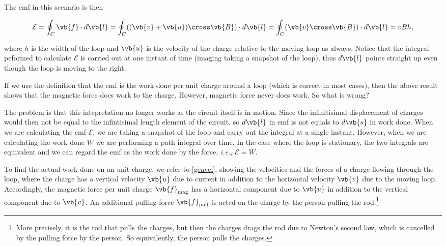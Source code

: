\documentclass[english,a4paper,12pt]{report}
\begin{document}
The emf in this scenario is then 

\begin{equation}
    \mathcal{E} = \oint_{C} \vb{f}  \cdot d \vb{l} = \oint_{C} ((\vb{v} + \vb{u}) \cross \vb{B} ) \cdot  d\vb{l}  = \oint_{C}(\vb{v} \cross \vb{B} )\cdot d \vb{l} =  vBh ,
\end{equation}

where \(h\) is the width of the loop and \(\vb{u}\) is the velocity of the charge relative to the moving loop as always. Notice that the integral peformed to calculate \(\mathcal{E}\) is carried out at one instant of time (imaging taking a snapshot of the loop), thus \(d \vb{l} \) points straight up even though the loop is moving to the right.  

If we use the definition that the emf is the work done per unit charge around a loop (which is correct in most cases), then the above result shows that the magnetic force does work to the charge. However, magnetic force never does work. So what is wrong?

The problem is that this intepretation no longer works as the circuit itself is in motion. Since the infinitisimal displacement of charges would then not be equal to the infintisimal length element of the circuit, so \(d \vb{l} \) in emf is not equals to \(d \vb{s} \) in work done. When we are calculating the emf \(\mathcal{E}\), we are taking a snapshot of the loop and carry out the integral at a single instant. However, when we are calculating the work done \(W\) we are performing a path integral over time. In the case where the loop is stationary, the two integrals are equivalent and we can regard the emf as the work done by the force, \textit{i.e.,} \(\mathcal{E}= W\). 

To find the actual work done on an unit charge, we refer to \cref{genvel}, showing the velocities and the forces of a charge flowing through the loop, where the charge has a vertical velocity \(\vb{u}\) due to current in addition to the horizontal velocity \(\vb{v} \) due to the moving loop. Accordingly, the magnetic force per unit charge \(\vb{f} _{\text{mag} } \) has a horizontal component due to \(\vb{u}\) in addition to the vertical component due to \(\vb{v} \). An additional pulling force \(\vb{f} _{\text{pull} } \) is acted on the charge by the person pulling the rod.\footnote{More precisely, it is the rod that pulls the charges, but then the charges drags the rod due to Newton's second law, which is cancelled by the pulling force by the person. So equivalently, the person pulls the charges.}   
\end{document}

